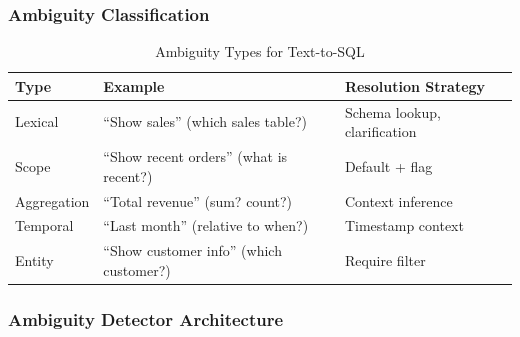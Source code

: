 \subsubsection{Ambiguity Classification}

\begin{table}[htbp]
\centering
\footnotesize
\caption{Ambiguity Types for Text-to-SQL}
\begin{tabularx}{\textwidth}{@{}l X l@{}}
\toprule
\textbf{Type} & \textbf{Example} & \textbf{Resolution Strategy} \\
\midrule
Lexical & ``Show sales'' (which sales table?) & Schema lookup, clarification \\
Scope & ``Show recent orders'' (what is recent?) & Default + flag \\
Aggregation & ``Total revenue'' (sum? count?) & Context inference \\
Temporal & ``Last month'' (relative to when?) & Timestamp context \\
Entity & ``Show customer info'' (which customer?) & Require filter \\
\bottomrule
\end{tabularx}
\end{table}

\subsubsection{Ambiguity Detector Architecture}

